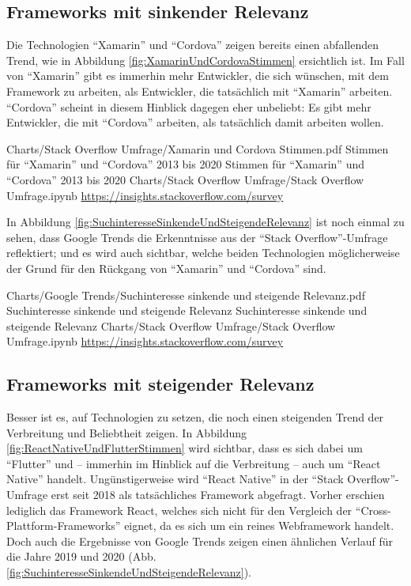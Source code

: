 \subsection{Frameworks mit sinkender Relevanz}

Die Technologien \enquote{Xamarin} und \enquote{Cordova} zeigen bereits einen abfallenden Trend, wie in Abbildung \ref{fig:XamarinUndCordovaStimmen} ersichtlich ist.
Im Fall von \enquote{Xamarin} gibt es immerhin mehr Entwickler, die sich wünschen, mit dem Framework zu arbeiten, als Entwickler, die tatsächlich mit \enquote{Xamarin} arbeiten.
\enquote{Cordova} scheint in diesem Hinblick dagegen eher unbeliebt: Es gibt mehr Entwickler, die mit \enquote{Cordova} arbeiten, als tatsächlich damit arbeiten wollen.

\begin{alexfigurewithnotebook}{Charts/Stack Overflow Umfrage/Xamarin und Cordova Stimmen.pdf}
	{Stimmen für \enquote{Xamarin} und \enquote{Cordova} 2013 bis 2020}
	{Stimmen für \enquote{Xamarin} und \enquote{Cordova} 2013 bis 2020}
	{Charts/Stack Overflow Umfrage/Stack Overflow Umfrage.ipynb}
	{\url{https://insights.stackoverflow.com/survey}}
	\label{fig:XamarinUndCordovaStimmen}

\end{alexfigurewithnotebook}


In Abbildung \ref{fig:SuchinteresseSinkendeUndSteigendeRelevanz} ist noch einmal zu sehen, dass Google Trends die Erkenntnisse aus der \enquote{Stack Overflow}-Umfrage reflektiert;
und es wird auch sichtbar, welche beiden Technologien möglicherweise der Grund für den Rückgang von \enquote{Xamarin} und \enquote{Cordova} sind.

\begin{alexfigurewithnotebook}{Charts/Google Trends/Suchinteresse sinkende und steigende Relevanz.pdf}
	{Suchinteresse sinkende und steigende Relevanz}
	{Suchinteresse sinkende und steigende Relevanz}
	{Charts/Stack Overflow Umfrage/Stack Overflow Umfrage.ipynb}
	{\url{https://insights.stackoverflow.com/survey}}
	\label{fig:SuchinteresseSinkendeUndSteigendeRelevanz}

\end{alexfigurewithnotebook}

\subsection{Frameworks mit steigender Relevanz}

Besser ist es, auf Technologien zu setzen, die noch einen steigenden Trend der Verbreitung und Beliebtheit zeigen.
In Abbildung \ref{fig:ReactNativeUndFlutterStimmen} wird sichtbar, dass es sich dabei um \enquote{Flutter} und -- immerhin im Hinblick auf die Verbreitung -- auch um \enquote{React Native} handelt.
Ungünstigerweise wird \enquote{React Native} in der \enquote{Stack Overflow}-Umfrage erst seit 2018 als tatsächliches Framework abgefragt.
Vorher erschien lediglich das Framework React, welches sich nicht für den Vergleich der \enquote{Cross-Plattform-Frameworks} eignet, da es sich um ein reines Webframework handelt.
Doch auch die Ergebnisse von Google Trends zeigen einen ähnlichen Verlauf für die Jahre 2019 und 2020 (Abb. \ref{fig:SuchinteresseSinkendeUndSteigendeRelevanz}).

